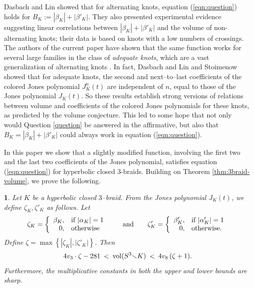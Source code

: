 \documentclass[11pt]{amsart}
\renewcommand{\setminus}{{\smallsetminus}}
\newcommand{\vol}{{\rm vol}}
\newcommand{\abs}[1]{{\left\vert #1 \right\vert}}
\theoremstyle{plain}
\newtheorem*{namedtheorem}{\theoremname}
\newcommand{\theoremname}{testing}
\newenvironment{named}[1]{\renewcommand{\theoremname}{#1}\begin{namedtheorem}}{\end{namedtheorem}}
\theoremstyle{definition}
\begin{document}
Dasbach and Lin \cite{dasbach-lin:volumeish} showed that for
alternating knots, equation (\ref{eqn:question}) holds for $B_K:=\abs
{\beta_K}+\abs {\beta'_K}$.  They also presented experimental evidence
suggesting linear correlations between $\abs {\beta_K}+\abs
{\beta'_K}$ and the volume of non-alternating knots; their data is
based on knots with a low numbers of crossings.  The authors of the
current paper have shown that the same function works for several
large families in the class of \emph{adequate knots}, which are a vast
generalization of alternating knots \cite{fkp-07,fkp:conway}.  In
fact, Dasbach and Lin \cite{dasbach-lin:head-tail} and Stoimenow 
\cite{stoimenow:amphichiral}
showed that for adequate knots, the second and
next--to--last coefficients of the colored Jones polynomial $J_K^n(t)$
are independent of $n$, equal to those of the Jones polynomial
$J_K(t)$. So these results establish strong versions of
relations between volume and coefficients of the colored Jones
polynomials for these knots, as predicted by the volume conjecture.
This led to some hope that not only would Question \ref{question} be
answered in the affirmative, but also that $B_K = \abs{\beta_K} +
\abs{\beta'_K}$ could always work in equation (\ref{eqn:question}).


In this paper we show that  a slightly modified function,  involving
the first two and the last two coefficients of the Jones polynomial, 
satisfies equation (\ref{eqn:question}) for hyperbolic closed 3-braids.
Building on Theorem \ref{thm:3braid-volume}, we prove the following.

\begin{named}{Theorem \ref{thm:relations}}
Let $K$ be a hyperbolic closed $3$--braid. 
From the Jones polynomial $J_K(t)$, we define ${\zeta_K}, {\zeta'_K}$ as follows. Let
$$\zeta_K = \left\{ \begin{array}{r l}
\beta_K, & \mbox{if } \abs{\alpha_K} = 1 \\
0, & \mbox{otherwise}
\end{array} \right.
\qquad \mbox{and} \qquad
\zeta'_K = \left\{ \begin{array}{r l}
\beta'_K, & \mbox{if } \abs{\alpha'_K} = 1 \\
0, & \mbox{otherwise.}
\end{array} \right.$$
Define $\zeta = \max \left\{ \abs{\zeta_K}, \abs{\zeta'_K} \right\}$. Then
$$4v_3 \cdot \zeta - 281 \: < \: \vol(S^3 \setminus K) \: < \:
4v_8 \, ( \zeta +1 ).$$
Furthermore, the multiplicative constants in both the upper and lower bounds are sharp.
\end{named}
\end{document}
